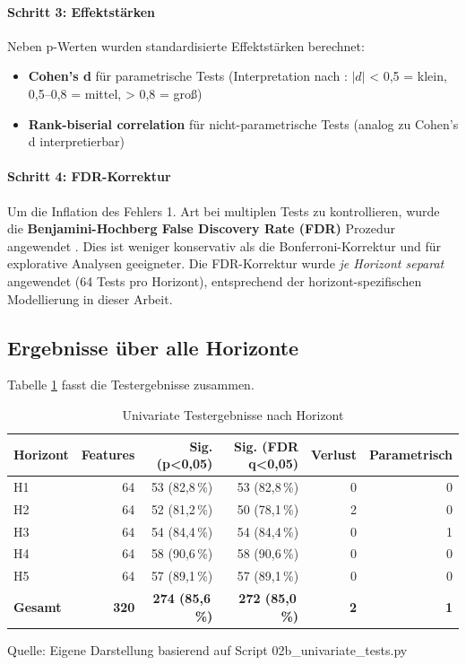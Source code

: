 \paragraph{Schritt 3: Effektstärken} Neben p-Werten wurden standardisierte Effektstärken berechnet:
\begin{itemize}[topsep=0.2\baselineskip]
    \item \textbf{Cohen's d} für parametrische Tests (Interpretation nach \parencite{cohen1988statistical}: $|d|$ < 0,5 = klein, 0,5–0,8 = mittel, > 0,8 = groß)
    \item \textbf{Rank-biserial correlation} für nicht-parametrische Tests (analog zu Cohen's d interpretierbar)
\end{itemize}

\paragraph{Schritt 4: FDR-Korrektur} Um die Inflation des Fehlers 1. Art bei multiplen Tests zu kontrollieren, wurde die \textbf{Benjamini-Hochberg False Discovery Rate (FDR)} Prozedur angewendet \parencite{benjamini1995controlling}. Dies ist weniger konservativ als die Bonferroni-Korrektur und für explorative Analysen geeigneter. Die FDR-Korrektur wurde \textit{je Horizont separat} angewendet (64 Tests pro Horizont), entsprechend der horizont-spezifischen Modellierung in dieser Arbeit.

\subsection{Ergebnisse über alle Horizonte}

Tabelle \ref{tab:univariate_summary} fasst die Testergebnisse zusammen.

\begin{table}[htbp]
\centering
\caption{Univariate Testergebnisse nach Horizont}
\label{tab:univariate_summary}
\begin{tabular}{lrrrrr}
\toprule
\textbf{Horizont} & \textbf{Features} & \textbf{Sig. (p<0{,}05)} & \textbf{Sig. (FDR q<0{,}05)} & \textbf{Verlust} & \textbf{Parametrisch} \\
\midrule
H1 & 64 & 53 (82,8\,\%) & 53 (82,8\,\%) & 0 & 0 \\
H2 & 64 & 52 (81,2\,\%) & 50 (78,1\,\%) & 2 & 0 \\
H3 & 64 & 54 (84,4\,\%) & 54 (84,4\,\%) & 0 & 1 \\
H4 & 64 & 58 (90,6\,\%) & 58 (90,6\,\%) & 0 & 0 \\
H5 & 64 & 57 (89,1\,\%) & 57 (89,1\,\%) & 0 & 0 \\
\midrule
\textbf{Gesamt} & \textbf{320} & \textbf{274 (85,6\,\%)} & \textbf{272 (85,0\,\%)} & \textbf{2} & \textbf{1} \\
\bottomrule
\end{tabular}
\par\smallskip
{\footnotesize Quelle: Eigene Darstellung basierend auf Script 02b\_univariate\_tests.py}
\end{table}

